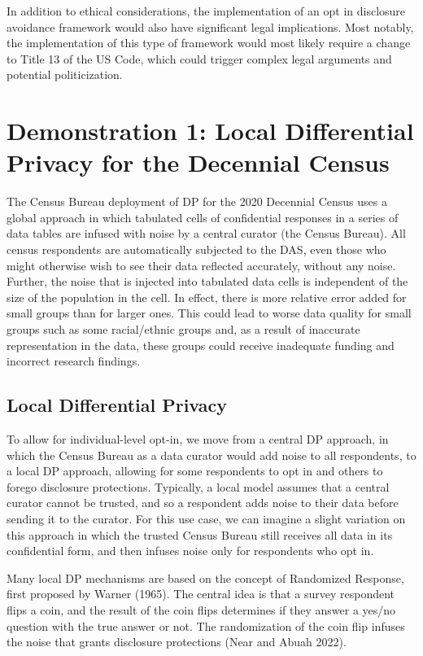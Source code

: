 \documentclass[
]{urban-formatting}
\begin{document}
In addition to ethical considerations, the implementation of an opt in
disclosure avoidance framework would also have significant legal
implications. Most notably, the implementation of this type of framework
would most likely require a change to Title 13 of the US Code, which
could trigger complex legal arguments and potential politicization.

\section{Demonstration 1: Local Differential Privacy for the Decennial Census}

The Census Bureau deployment of DP for the 2020 Decennial Census uses a
global approach in which tabulated cells of confidential responses in a
series of data tables are infused with noise by a central curator (the
Census Bureau). All census respondents are automatically subjected to
the DAS, even those who might otherwise wish to see their data reflected
accurately, without any noise. Further, the noise that is injected into
tabulated data cells is independent of the size of the population in the
cell. In effect, there is more relative error added for small groups
than for larger ones. This could lead to worse data quality for small
groups such as some racial/ethnic groups and, as a result of inaccurate
representation in the data, these groups could receive inadequate
funding and incorrect research findings.

\subsection{Local Differential Privacy}

To allow for individual-level opt-in, we move from a central DP
approach, in which the Census Bureau as a data curator would add noise
to all respondents, to a local DP approach, allowing for some
respondents to opt in and others to forego disclosure protections.
Typically, a local model assumes that a central curator cannot be
trusted, and so a respondent adds noise to their data before sending it
to the curator. For this use case, we can imagine a slight variation on
this approach in which the trusted Census Bureau still receives all data
in its confidential form, and then infuses noise only for respondents
who opt in.

Many local DP mechanisms are based on the concept of Randomized
Response, first proposed by Warner (1965). The central idea is that a
survey respondent flips a coin, and the result of the coin flips
determines if they answer a yes/no question with the true answer or not.
The randomization of the coin flip infuses the noise that grants
disclosure protections (Near and Abuah 2022).
\end{document}
